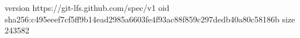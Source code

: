 version https://git-lfs.github.com/spec/v1
oid sha256:c495eeef7cf5ff9b14ead2985a6603fe4f93ac88f859c297dedb40a80c58186b
size 243582
